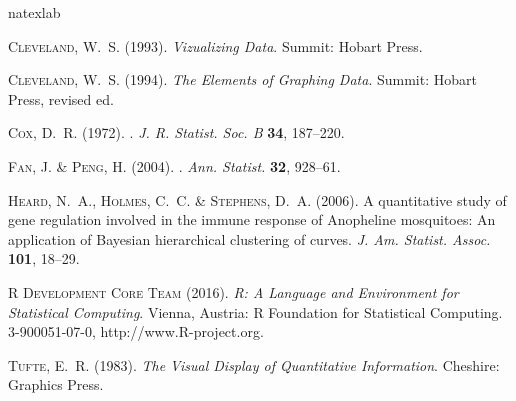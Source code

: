\documentclass[article,lineno]{biometrika}
\begin{document}
\begin{thebibliography}{7}
\expandafter\ifx\csname natexlab\endcsname\relax\def\natexlab#1{#1}\fi

\textsc{Cleveland, W.~S.} (1993).
\newblock \textit{{Vizualizing Data}}.
\newblock Summit: Hobart Press.

\textsc{Cleveland, W.~S.} (1994).
\newblock \textit{{The Elements of Graphing Data}}.
\newblock Summit: Hobart Press, revised ed.

\textsc{Cox, D.~R.} (1972).
.
\newblock \textit{J. R. Statist. Soc. {\rm B}} \textbf{34}, 187--220.

\textsc{Fan, J.} \& \textsc{Peng, H.} (2004).
.
\newblock \textit{Ann. Statist.} \textbf{32}, 928--61.

\textsc{Heard, N.~A.}, \textsc{Holmes, C.~C.} \& \textsc{Stephens, D.~A.}
  (2006).
\newblock A quantitative study of gene regulation involved in the immune
  response of {A}nopheline mosquitoes: {A}n application of {B}ayesian
  hierarchical clustering of curves.
\newblock \textit{J. Am. Statist. Assoc.} \textbf{101}, 18--29.

\textsc{{R Development Core Team}} (2016).
\newblock \textit{R: A Language and Environment for Statistical Computing}.
\newblock Vienna, Austria: R Foundation for Statistical Computing.
 3-900051-07-0, http://www.R-project.org.

\textsc{Tufte, E.~R.} (1983).
\newblock \textit{{The Visual Display of Quantitative Information}}.
\newblock Cheshire: Graphics Press.

\end{thebibliography}
\end{document}
